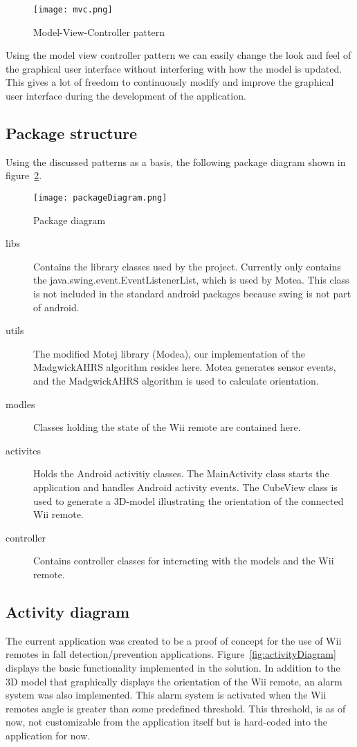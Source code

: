 \begin{figure}[h!]
  \centering
    \texttt{[image: mvc.png]}
    \caption{\footnotesize Model-View-Controller pattern}
    \label{fig:mvc}
\end{figure}

Using the model view controller pattern we can easily change the look and feel of the graphical user interface without interfering with how the model is updated. This gives a lot of freedom to continuously modify and improve the graphical user interface during the development of the application. 

\subsection{Package structure}
Using the discussed patterns as a basis, the following package diagram shown in figure~\ref{fig:packageDiagram}. 

\begin{figure}[h!]
  \centering
    \texttt{[image: packageDiagram.png]}
    \caption{\footnotesize Package diagram}
    \label{fig:packageDiagram}
\end{figure}

\begin{description}
	\item[libs] Contains the library classes used by the project. Currently only contains the java.swing.event.EventListenerList, which is used by Motea. This class is not included in the standard android packages because swing is not part of android.
	\item[utils] The modified Motej library (Modea), our implementation of the MadgwickAHRS algorithm resides here. Motea generates sensor events, and the MadgwickAHRS algorithm is used to calculate orientation.
	\item[modles] Classes holding the state of the Wii remote are contained here.
	\item[activites] Holds the Android activitiy classes. The MainActivity class starts the application and handles Android activity events. The CubeView class is used to generate a 3D-model illustrating the orientation of the connected Wii remote.
	\item[controller] Contains controller classes for interacting with the models and the Wii remote.
\end{description}

\subsection{Activity diagram}
The current application was created to be a proof of concept for the use of Wii remotes in fall detection/prevention applications. Figure~\ref{fig:activityDiagram} displays the basic functionality implemented in the solution. In addition to the 3D model that graphically displays the orientation of the Wii remote, an alarm system was also implemented. This alarm system is activated when the Wii remotes angle is greater than some predefined threshold. This threshold, is as of now, not customizable from the application itself but is hard-coded  into the application for now. 

